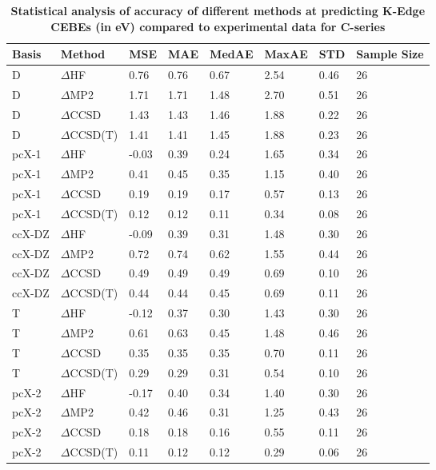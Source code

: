 \begin{table}
  \caption{\textbf{Statistical analysis of accuracy of different methods at predicting K-Edge CEBEs (in eV) compared to experimental data for C-series}}
  \label{tbl:method-summary-c}
  \begin{tabular}{l l l l l l l l }
    \toprule
    \textbf{Basis} & \textbf{Method} & \textbf{MSE} & \textbf{MAE} & \textbf{MedAE} & \textbf{MaxAE} & \textbf{STD} & \textbf{Sample Size} \\ 
    \midrule
    D & $\Delta$HF & 0.76 & 0.76 & 0.67 & 2.54 & 0.46 & 26 \\ 
    D & $\Delta$MP2 & 1.71 & 1.71 & 1.48 & 2.70 & 0.51 & 26 \\ 
    D & $\Delta$CCSD & 1.43 & 1.43 & 1.46 & 1.88 & 0.22 & 26 \\ 
    D & $\Delta$CCSD(T) & 1.41 & 1.41 & 1.45 & 1.88 & 0.23 & 26 \\ 
    pcX-1 & $\Delta$HF & -0.03 & 0.39 & 0.24 & 1.65 & 0.34 & 26 \\ 
    pcX-1 & $\Delta$MP2 & 0.41 & 0.45 & 0.35 & 1.15 & 0.40 & 26 \\ 
    pcX-1 & $\Delta$CCSD & 0.19 & 0.19 & 0.17 & 0.57 & 0.13 & 26 \\ 
    pcX-1 & $\Delta$CCSD(T) & 0.12 & 0.12 & 0.11 & 0.34 & 0.08 & 26 \\ 
    ccX-DZ & $\Delta$HF & -0.09 & 0.39 & 0.31 & 1.48 & 0.30 & 26 \\ 
    ccX-DZ & $\Delta$MP2 & 0.72 & 0.74 & 0.62 & 1.55 & 0.44 & 26 \\ 
    ccX-DZ & $\Delta$CCSD & 0.49 & 0.49 & 0.49 & 0.69 & 0.10 & 26 \\ 
    ccX-DZ & $\Delta$CCSD(T) & 0.44 & 0.44 & 0.45 & 0.69 & 0.11 & 26 \\ 
    T & $\Delta$HF & -0.12 & 0.37 & 0.30 & 1.43 & 0.30 & 26 \\ 
    T & $\Delta$MP2 & 0.61 & 0.63 & 0.45 & 1.48 & 0.46 & 26 \\ 
    T & $\Delta$CCSD & 0.35 & 0.35 & 0.35 & 0.70 & 0.11 & 26 \\ 
    T & $\Delta$CCSD(T) & 0.29 & 0.29 & 0.31 & 0.54 & 0.10 & 26 \\ 
    pcX-2 & $\Delta$HF & -0.17 & 0.40 & 0.34 & 1.40 & 0.30 & 26 \\ 
    pcX-2 & $\Delta$MP2 & 0.42 & 0.46 & 0.31 & 1.25 & 0.43 & 26 \\ 
    pcX-2 & $\Delta$CCSD & 0.18 & 0.18 & 0.16 & 0.55 & 0.11 & 26 \\ 
    pcX-2 & $\Delta$CCSD(T) & 0.11 & 0.12 & 0.12 & 0.29 & 0.06 & 26 \\ 

\end{tabular}
\end{table}
